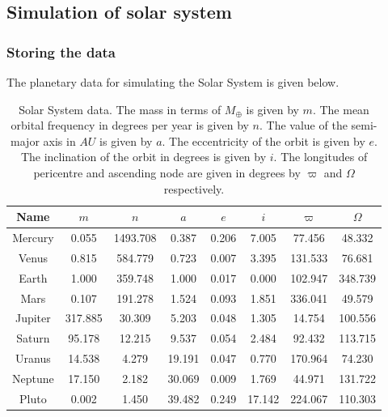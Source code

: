 \documentclass[11pt, oneside]{article}   	%
\begin{document}
\subsection{Simulation of solar system}

\subsubsection*{Storing the data}

The planetary data for simulating the Solar System is given below.
\begin{table}[!h]
\centering
\caption{\small{Solar System data. The mass in terms of $M_{\oplus}$ is given by $m$. The mean orbital frequency in degrees per year is given by $n$. The value of the semi-major axis in $AU$ is given by $a$. The eccentricity of the orbit is given by $e$. The inclination of the orbit in degrees is given by $i$. The longitudes of pericentre and ascending node are given in degrees by $\varpi$ and $\Omega$ respectively.}}
\label{SSdata}
\begin{tabular}{|c|c|c|c|c|c|c|c|}
\hline
\rowcolor[HTML]{C0C0C0} 
Name    & $m$    & $n$        & $a$      & $e$     & $i$      & $\varpi$ & $\Omega$   \\ \hline
Mercury & 0.055   & 1493.708 & 0.387  & 0.206 & 7.005  & 77.456     & 48.332  \\ \hline
Venus   & 0.815   & 584.779  & 0.723  & 0.007 & 3.395  & 131.533    & 76.681  \\ \hline
Earth   & 1.000   & 359.748  & 1.000  & 0.017 & 0.000  & 102.947    & 348.739 \\ \hline
Mars    & 0.107   & 191.278  & 1.524  & 0.093 & 1.851  & 336.041    & 49.579  \\ \hline
Jupiter & 317.885 & 30.309   & 5.203  & 0.048 & 1.305  & 14.754     & 100.556 \\ \hline
Saturn  & 95.178  & 12.215   & 9.537  & 0.054 & 2.484  & 92.432     & 113.715 \\ \hline
Uranus  & 14.538  & 4.279    & 19.191 & 0.047 & 0.770  & 170.964    & 74.230  \\ \hline
Neptune & 17.150  & 2.182    & 30.069 & 0.009 & 1.769  & 44.971     & 131.722 \\ \hline
Pluto   & 0.002   & 1.450    & 39.482 & 0.249 & 17.142 & 224.067    & 110.303 \\ \hline
\end{tabular}
\end{table}
\end{document}
